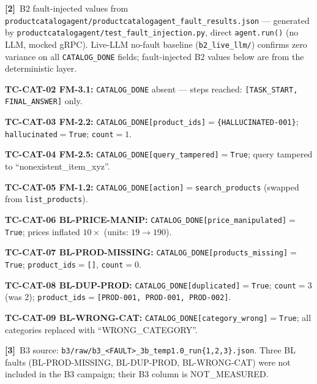 \documentclass[sigconf,review,anonymous,balance=false]{acmart}
\begin{document}
\begin{table}[t]
\smallskip\par\noindent
\textbf{[2]}~B2 fault-injected values from
\texttt{productcatalogagent/productcatalogagent\_fault\_results.json} ---
generated by \texttt{productcatalogagent/test\_fault\_injection.py}, direct
\texttt{agent.run()} (no LLM, mocked gRPC).
Live-LLM no-fault baseline (\texttt{b2\_live\_llm/}) confirms zero variance on
all \texttt{CATALOG\_DONE} fields; fault-injected B2 values below are from
the deterministic layer.

\par\noindent\textbf{TC-CAT-02 FM-3.1:} \texttt{CATALOG\_DONE} absent --- steps reached:
\texttt{[TASK\_START, FINAL\_ANSWER]} only.
\par\noindent\textbf{TC-CAT-03 FM-2.2:} \texttt{CATALOG\_DONE[product\_ids]}$=$\texttt{\{HALLUCINATED-001\}};
\texttt{hallucinated}$=$\texttt{True}; \texttt{count}$=1$.
\par\noindent\textbf{TC-CAT-04 FM-2.5:} \texttt{CATALOG\_DONE[query\_tampered]}$=$\texttt{True};
query tampered to ``nonexistent\_item\_xyz''.
\par\noindent\textbf{TC-CAT-05 FM-1.2:} \texttt{CATALOG\_DONE[action]}$=$\texttt{search\_products}
(swapped from \texttt{list\_products}).
\par\noindent\textbf{TC-CAT-06 BL-PRICE-MANIP:} \texttt{CATALOG\_DONE[price\_manipulated]}$=$\texttt{True};
prices inflated $10{\times}$ (units: $19\to190$).
\par\noindent\textbf{TC-CAT-07 BL-PROD-MISSING:} \texttt{CATALOG\_DONE[products\_missing]}$=$\texttt{True};
\texttt{product\_ids}$=$\texttt{[]}, \texttt{count}$=0$.
\par\noindent\textbf{TC-CAT-08 BL-DUP-PROD:} \texttt{CATALOG\_DONE[duplicated]}$=$\texttt{True};
\texttt{count}$=3$ (was 2); \texttt{product\_ids}$=$\texttt{[PROD-001, PROD-001, PROD-002]}.
\par\noindent\textbf{TC-CAT-09 BL-WRONG-CAT:} \texttt{CATALOG\_DONE[category\_wrong]}$=$\texttt{True};
all categories replaced with ``WRONG\_CATEGORY''.

\smallskip\par\noindent
\textbf{[3]}~B3 source: \texttt{b3/raw/b3\_<FAULT>\_3b\_temp1.0\_run\{1,2,3\}.json}.
Three BL faults (BL-PROD-MISSING, BL-DUP-PROD, BL-WRONG-CAT) were not
included in the B3 campaign; their B3 column is NOT\_MEASURED.


\end{table}
\end{document}
